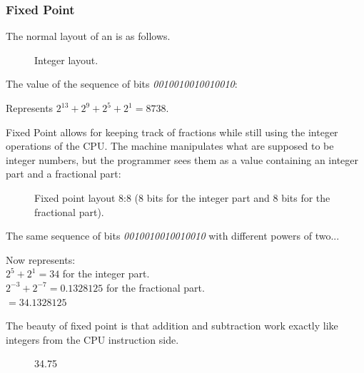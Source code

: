 \subsubsection{Fixed Point}
The normal layout of an  is as follows.
\begin{figure}[H]
\centering
 
 \caption{Integer layout.} \label{fig:int_layout}
 \end{figure}
The value of the sequence of bits \emph{0010010010010010}:
\begin{figure}[H]
\centering

 \end{figure}

Represents $ 2^{13} + 2^9 + 2^5 + 2^1 =  8738 $.\\
 \par

Fixed Point allows for keeping track of fractions while still using the integer operations of the CPU. The machine manipulates what are supposed to be integer numbers, but the programmer sees them as a value containing an integer part and a fractional part:\\
\par
\begin{figure}[H]
 \centering
  
 \caption{Fixed point layout 8:8 (8 bits for the integer part and 8 bits for the fractional part).} \label{fig:mips}
\end{figure}

The same sequence of bits \emph{0010010010010010} with different powers of two...
\begin{figure}[H]
 \centering
   
\end{figure} 

Now represents:\\

$ 2^5 + 2^1 = 34 $ for the integer part.\\
$ 2^{-3}+2^{-7} = 0.1328125 $ for the fractional part.\\
$ = 34.1328125$\\

\bigskip

The beauty of fixed point is that addition and subtraction work exactly like integers from the CPU instruction side.\\




\par
\begin{figure}[H]
 \centering
   

   \caption{34.75} 
\end{figure} 

